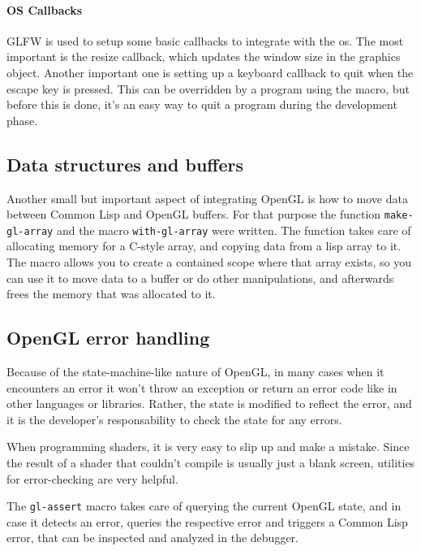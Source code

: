 \paragraph{OS Callbacks}

GLFW is used to setup some basic callbacks to integrate with the \ac{os}.
The most important is the resize callback,
which updates the window size in the graphics object.
Another important one is setting up a keyboard callback to quit when the escape key is pressed.
This can be overridden by a program using the macro,
but before this is done,
it's an easy way to quit a program during the development phase.

\subsection{Data structures and buffers}

Another small but important aspect of integrating OpenGL is how to move data between Common Lisp and OpenGL buffers.
For that purpose the function \texttt{make-gl-array} and the macro \texttt{with-gl-array} were written.
The function takes care of allocating memory for a C-style array,
and copying data from a lisp array to it.
The macro allows you to create a contained scope where that array exists,
so you can use it to move data to a buffer or do other manipulations,
and afterwards frees the memory that was allocated to it.

\subsection{OpenGL error handling}

Because of the state-machine-like nature of OpenGL,
in many cases when it encounters an error it won't throw an exception or return an error code like in other languages or libraries.
Rather,
the state is modified to reflect the error,
and it is the developer's responsability to check the state for any errors.

When programming shaders,
it is very easy to slip up and make a mistake.
Since the result of a shader that couldn't compile is usually just a blank screen,
utilities for error-checking are very helpful.

The \texttt{gl-assert} macro takes care of querying the current OpenGL state,
and in case it detects an error,
queries the respective error and triggers a Common Lisp error,
that can be inspected and analyzed in the debugger.
